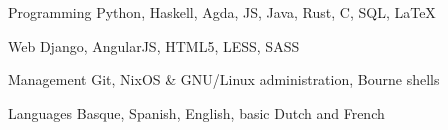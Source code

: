 

\begin{cvskills}

  \cvskill
    {Programming} %
    {Python, Haskell, Agda, JS, Java, Rust, C, SQL, LaTeX} %

  \cvskill
    {Web} %
    {Django, AngularJS, HTML5, LESS, SASS} %

  \cvskill
    {Management} %
    {Git, NixOS \& GNU/Linux administration, Bourne shells} %

  \cvskill
    {Languages} %
    {Basque, Spanish, English, basic Dutch and French} %

\end{cvskills}
